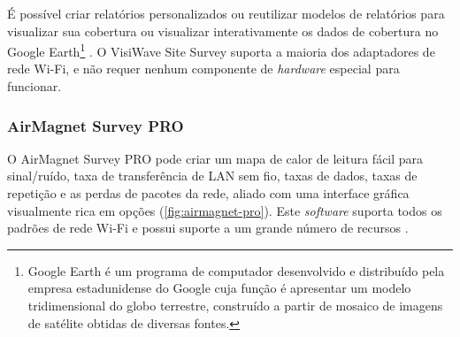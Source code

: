 É possível criar relatórios personalizados ou reutilizar modelos de relatórios para visualizar sua cobertura ou visualizar interativamente os dados de cobertura no Google Earth\footnote{Google Earth é um programa de computador desenvolvido e distribuído pela empresa estadunidense do Google cuja função é apresentar um modelo tridimensional do globo terrestre, construído a partir de mosaico de imagens de satélite obtidas de diversas fontes.} \cite{Netspot2019}. O VisiWave Site Survey suporta a maioria dos adaptadores de rede Wi-Fi, e não requer nenhum componente de \textit{hardware} especial para funcionar.
\newpage
\begin{figure}[H]
	\centering
\end{figure}

\subsubsection{AirMagnet Survey PRO}
\label{subsubsec:airmagnet-pro}

O AirMagnet Survey PRO pode criar um mapa de calor de leitura fácil para sinal/ruído, taxa de transferência de LAN sem fio, taxas de dados, taxas de repetição e as perdas de pacotes da rede, aliado com uma interface gráfica visualmente rica em opções (\autoref{fig:airmagnet-pro}). Este \textit{software} suporta todos os padrões de rede Wi-Fi e possui suporte a um grande número de recursos \cite{Netspot2019}.

